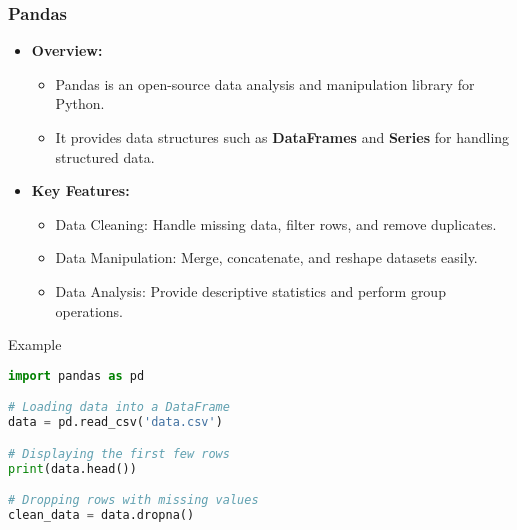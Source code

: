 \documentclass{beamer}
\begin{document}
\begin{frame}[fragile]
    \frametitle{Pandas}
    \begin{itemize}
        \item \textbf{Overview:} 
        \begin{itemize}
            \item Pandas is an open-source data analysis and manipulation library for Python.
            \item It provides data structures such as \textbf{DataFrames} and \textbf{Series} for handling structured data.
        \end{itemize}
        
        \item \textbf{Key Features:} 
        \begin{itemize}
            \item Data Cleaning: Handle missing data, filter rows, and remove duplicates.
            \item Data Manipulation: Merge, concatenate, and reshape datasets easily.
            \item Data Analysis: Provide descriptive statistics and perform group operations.
        \end{itemize}
    \end{itemize}

    \begin{block}{Example}
    \begin{lstlisting}[language=Python]
import pandas as pd

# Loading data into a DataFrame
data = pd.read_csv('data.csv')

# Displaying the first few rows
print(data.head())

# Dropping rows with missing values
clean_data = data.dropna()
    \end{lstlisting}
    \end{block}
\end{frame}
\end{document}
